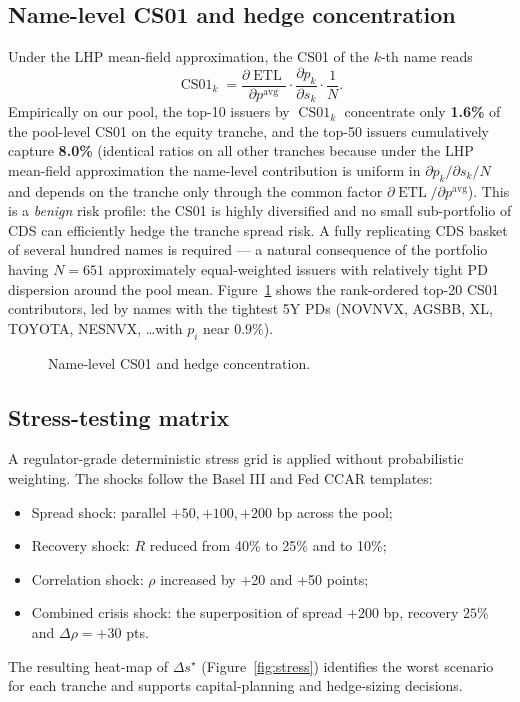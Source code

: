 \documentclass[11pt,a4paper]{article}
\newcommand{\1}{\mathbf{1}}
\DeclareMathOperator{\ETL}{ETL}
\DeclareMathOperator{\CS}{CS01}
\begin{document}
\subsection{Name-level CS01 and hedge concentration}
Under the LHP mean-field approximation, the CS01 of the
\(k\)-th name reads
\begin{equation}
\CS_{k}
 = \frac{\partial\ETL}{\partial p^{\text{avg}}}
   \cdot\frac{\partial p_{k}}{\partial s_{k}}\cdot\frac{1}{N}.
\label{eq:name_cs01}
\end{equation}
Empirically on our pool, the top-10 issuers by \(\CS_{k}\)
concentrate only \textbf{1.6\%} of the pool-level CS01 on the
equity tranche, and the top-50 issuers cumulatively capture
\textbf{8.0\%} (identical ratios on all other tranches because
under the LHP mean-field approximation the name-level contribution
is uniform in \(\partial p_k/\partial s_k/N\) and depends on the
tranche only through the common factor
\(\partial \ETL/\partial p^{\text{avg}}\)). This is a
\emph{benign} risk profile: the CS01 is highly diversified and no
small sub-portfolio of CDS can efficiently hedge the tranche
spread risk. A fully replicating CDS basket of several hundred
names is required --- a natural consequence of the portfolio
having \(N=651\) approximately equal-weighted issuers with
relatively tight PD dispersion around the pool mean.
Figure~\ref{fig:name_cs01} shows the rank-ordered top-20 CS01
contributors, led by names with the tightest 5Y PDs
(NOVNVX, AGSBB, XL, TOYOTA, NESNVX, \ldots with \(p_i\) near
\(0.9\%\)).

\begin{figure}[H]
    \centering
    \caption{Name-level CS01 and hedge concentration.}
    \label{fig:name_cs01}
\end{figure}

\subsection{Stress-testing matrix}
A regulator-grade deterministic stress grid is applied without
probabilistic weighting. The shocks follow the Basel III and Fed CCAR
templates:
\begin{itemize}[leftmargin=2em]
    \item Spread shock: parallel \(+50,+100,+200\) bp across the pool;
    \item Recovery shock: \(R\) reduced from 40\% to 25\% and to 10\%;
    \item Correlation shock: \(\rho\) increased by +20 and +50 points;
    \item Combined crisis shock: the superposition of spread \(+200\) bp,
          recovery \(25\%\) and \(\Delta\rho = +30\) pts.
\end{itemize}
The resulting heat-map of \(\Delta s^{\star}\) (Figure~\ref{fig:stress})
identifies the worst scenario for each tranche and supports
capital-planning and hedge-sizing decisions.
\end{document}
